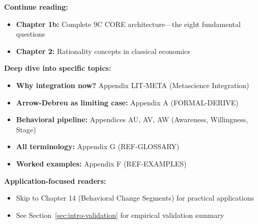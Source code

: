 \begin{tcolorbox}[colback=green!5!white, colframe=green!75!black,
    title=\textbf{Reading Paths from Chapter 1}]
\small

\textbf{Continue reading:}
\begin{itemize}[nosep]
    \item \textbf{Chapter 1b:} Complete 9C CORE architecture---the eight fundamental questions
    \item \textbf{Chapter 2:} Rationality concepts in classical economics
\end{itemize}

\medskip
\textbf{Deep dive into specific topics:}
\begin{itemize}[nosep]
    \item \textbf{Why integration now?} Appendix LIT-META (Metascience Integration)
    \item \textbf{Arrow-Debreu as limiting case:} Appendix A (FORMAL-DERIVE)
    \item \textbf{Behavioral pipeline:} Appendices AU, AV, AW (Awareness, Willingness, Stage)
    \item \textbf{All terminology:} Appendix G (REF-GLOSSARY)
    \item \textbf{Worked examples:} Appendix F (REF-EXAMPLES)
\end{itemize}

\medskip
\textbf{Application-focused readers:}
\begin{itemize}[nosep]
    \item Skip to Chapter 14 (Behavioral Change Segments) for practical applications
    \item See Section~\ref{sec:intro-validation} for empirical validation summary
\end{itemize}
\end{tcolorbox}

